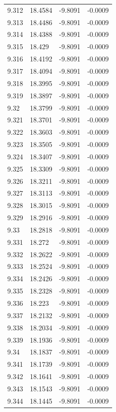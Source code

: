 \begin{tabular}{llll}
9.312 & 18.4584 & -9.8091 & -0.0009 \\
9.313 & 18.4486 & -9.8091 & -0.0009 \\
9.314 & 18.4388 & -9.8091 & -0.0009 \\
9.315 & 18.429 & -9.8091 & -0.0009 \\
9.316 & 18.4192 & -9.8091 & -0.0009 \\
9.317 & 18.4094 & -9.8091 & -0.0009 \\
9.318 & 18.3995 & -9.8091 & -0.0009 \\
9.319 & 18.3897 & -9.8091 & -0.0009 \\
9.32 & 18.3799 & -9.8091 & -0.0009 \\
9.321 & 18.3701 & -9.8091 & -0.0009 \\
9.322 & 18.3603 & -9.8091 & -0.0009 \\
9.323 & 18.3505 & -9.8091 & -0.0009 \\
9.324 & 18.3407 & -9.8091 & -0.0009 \\
9.325 & 18.3309 & -9.8091 & -0.0009 \\
9.326 & 18.3211 & -9.8091 & -0.0009 \\
9.327 & 18.3113 & -9.8091 & -0.0009 \\
9.328 & 18.3015 & -9.8091 & -0.0009 \\
9.329 & 18.2916 & -9.8091 & -0.0009 \\
9.33 & 18.2818 & -9.8091 & -0.0009 \\
9.331 & 18.272 & -9.8091 & -0.0009 \\
9.332 & 18.2622 & -9.8091 & -0.0009 \\
9.333 & 18.2524 & -9.8091 & -0.0009 \\
9.334 & 18.2426 & -9.8091 & -0.0009 \\
9.335 & 18.2328 & -9.8091 & -0.0009 \\
9.336 & 18.223 & -9.8091 & -0.0009 \\
9.337 & 18.2132 & -9.8091 & -0.0009 \\
9.338 & 18.2034 & -9.8091 & -0.0009 \\
9.339 & 18.1936 & -9.8091 & -0.0009 \\
9.34 & 18.1837 & -9.8091 & -0.0009 \\
9.341 & 18.1739 & -9.8091 & -0.0009 \\
9.342 & 18.1641 & -9.8091 & -0.0009 \\
9.343 & 18.1543 & -9.8091 & -0.0009 \\
9.344 & 18.1445 & -9.8091 & -0.0009 \\

\end{tabular}
